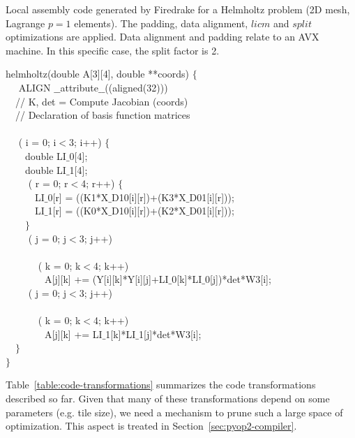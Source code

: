 \documentclass[conference]{IEEEtran}
\begin{document}
\begin{algorithm}[t]
\small
\caption{Local assembly code generated by Firedrake for a Helmholtz problem (2D mesh, Lagrange $p=1$ elements). The padding, data alignment, $licm$ and $split$ optimizations are applied. Data alignment and padding relate to an AVX machine. In this specific case, the split factor is 2.}
\label{code:helmholtz-split}
 helmholtz(double A[3][4], double **coords) $\lbrace$\\
~~ ALIGN $\_\_$attribute$\_\_$((aligned(32))) \\
~~// K, det = Compute Jacobian (coords) \\
~~// Declaration of basis function matrices \\
~~\\
~~ ( i = 0; i$<$3; i++) $\lbrace$ \\
~~~~double LI$\_$0[4];\\
~~~~double LI$\_$1[4];\\
~~~~ ( r = 0; r$<$4; r++) $\lbrace$ \\
~~~~~~LI$\_$0[r] = ((K1*X$\_$D10[i][r])+(K3*X$\_$D01[i][r]));\\
~~~~~~LI$\_$1[r] = ((K0*X$\_$D10[i][r])+(K2*X$\_$D01[i][r]));\\
~~~~$\rbrace$\\
~~~~ ( j = 0; j$<$3; j++) \\
~~~~~~\\
~~~~~~ ( k = 0; k$<$4; k++) \\
~~~~~~~~A[j][k] += (Y[i][k]*Y[i][j]+LI$\_$0[k]*LI$\_$0[j])*det*W3[i];\\
~~~~ ( j = 0; j$<$3; j++) \\
~~~~~~\\
~~~~~~ ( k = 0; k$<$4; k++) \\
~~~~~~~~A[j][k] += LI$\_$1[k]*LI$\_$1[j]*det*W3[i];\\
~~$\rbrace$\\
$\rbrace$
\end{algorithm}

Table~\ref{table:code-transformations} summarizes the code transformations described so far. Given that many of these transformations depend on some parameters (e.g. tile size), we need a mechanism to prune such a large space of optimization. This aspect is treated in Section~\ref{sec:pyop2-compiler}.
\end{document}
